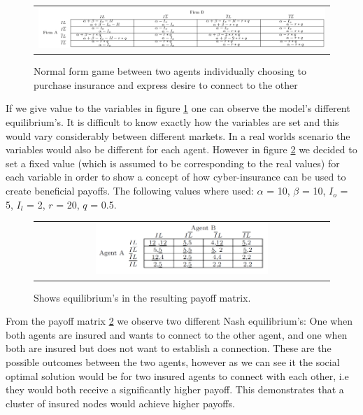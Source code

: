  
\begin{figure}[h]
\centering
\begin{tabular}{@{}c@{}}
\includegraphics[width=1.0\textwidth]{../Figures/gameTheoryModel1WithEquations.png}
\end{tabular}
\caption[Caption for LOF]{\label{fig:GTmodel1equations} Normal form game between two agents individually choosing to purchase insurance and express desire to connect to the other  \footnotemark }
\end{figure}

If we give value to the variables in figure \ref{fig:GTmodel1equations} one can observe the model's different equilibrium's. It is difficult to know exactly how the variables are set and this would vary considerably between different markets. In a real worlds scenario the variables would also be different for each agent. However in figure \ref{fig:GTmodel1} we decided to set a fixed value (which is assumed to be corresponding to the real values) for each variable in order to show a concept of how cyber-insurance can be used to create beneficial payoffs.
The following values where used: $\alpha$ = 10, $\beta$ = 10, $I_{o}$ = 5, $I_{l}$ = 2, $r$  = 20, $q$ = 0.5.


\begin{figure}[h]
\centering
\begin{tabular}{@{}c@{}}
\includegraphics[width=0.6\textwidth]{../Figures/gameTheoryModel1WithNumbers.png}
\end{tabular}
\caption{\label{fig:GTmodel1} Shows equilibrium's in the resulting payoff matrix.}
\end{figure}

From the payoff matrix \ref{fig:GTmodel1} we observe two different Nash equilibrium's: One when both agents are insured and wants to connect to the other agent, and one when both are insured but does not want to establish a connection. These are the possible outcomes between the two agents, however as we can see it the social optimal solution would be for two insured agents to connect with each other, i.e they would both receive a significantly higher payoff. This demonstrates that a cluster of insured nodes would achieve higher payoffs.  
